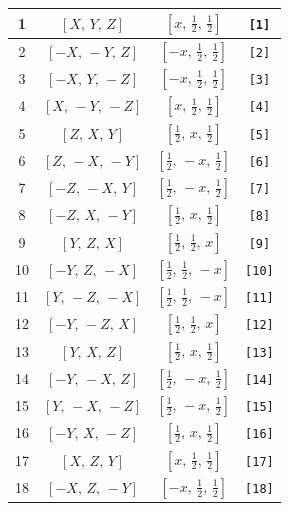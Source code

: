 \documentclass[fleqn,8pt]{jsarticle}
\begin{document}
\begin{longtable}{cccc}
1 & $\left[ X,\, Y,\, Z \right]$ & $\left[ x,\, \frac{1}{2},\, \frac{1}{2} \right]$ & {\tt [1]} \\ \hline
2 & $\left[ - X,\, - Y,\, Z \right]$ & $\left[ - x,\, \frac{1}{2},\, \frac{1}{2} \right]$ & {\tt [2]} \\ \hline
3 & $\left[ - X,\, Y,\, - Z \right]$ & $\left[ - x,\, \frac{1}{2},\, \frac{1}{2} \right]$ & {\tt [3]} \\ \hline
4 & $\left[ X,\, - Y,\, - Z \right]$ & $\left[ x,\, \frac{1}{2},\, \frac{1}{2} \right]$ & {\tt [4]} \\ \hline
5 & $\left[ Z,\, X,\, Y \right]$ & $\left[ \frac{1}{2},\, x,\, \frac{1}{2} \right]$ & {\tt [5]} \\ \hline
6 & $\left[ Z,\, - X,\, - Y \right]$ & $\left[ \frac{1}{2},\, - x,\, \frac{1}{2} \right]$ & {\tt [6]} \\ \hline
7 & $\left[ - Z,\, - X,\, Y \right]$ & $\left[ \frac{1}{2},\, - x,\, \frac{1}{2} \right]$ & {\tt [7]} \\ \hline
8 & $\left[ - Z,\, X,\, - Y \right]$ & $\left[ \frac{1}{2},\, x,\, \frac{1}{2} \right]$ & {\tt [8]} \\ \hline
9 & $\left[ Y,\, Z,\, X \right]$ & $\left[ \frac{1}{2},\, \frac{1}{2},\, x \right]$ & {\tt [9]} \\ \hline
10 & $\left[ - Y,\, Z,\, - X \right]$ & $\left[ \frac{1}{2},\, \frac{1}{2},\, - x \right]$ & {\tt [10]} \\ \hline
11 & $\left[ Y,\, - Z,\, - X \right]$ & $\left[ \frac{1}{2},\, \frac{1}{2},\, - x \right]$ & {\tt [11]} \\ \hline
12 & $\left[ - Y,\, - Z,\, X \right]$ & $\left[ \frac{1}{2},\, \frac{1}{2},\, x \right]$ & {\tt [12]} \\ \hline
13 & $\left[ Y,\, X,\, Z \right]$ & $\left[ \frac{1}{2},\, x,\, \frac{1}{2} \right]$ & {\tt [13]} \\ \hline
14 & $\left[ - Y,\, - X,\, Z \right]$ & $\left[ \frac{1}{2},\, - x,\, \frac{1}{2} \right]$ & {\tt [14]} \\ \hline
15 & $\left[ Y,\, - X,\, - Z \right]$ & $\left[ \frac{1}{2},\, - x,\, \frac{1}{2} \right]$ & {\tt [15]} \\ \hline
16 & $\left[ - Y,\, X,\, - Z \right]$ & $\left[ \frac{1}{2},\, x,\, \frac{1}{2} \right]$ & {\tt [16]} \\ \hline
17 & $\left[ X,\, Z,\, Y \right]$ & $\left[ x,\, \frac{1}{2},\, \frac{1}{2} \right]$ & {\tt [17]} \\ \hline
18 & $\left[ - X,\, Z,\, - Y \right]$ & $\left[ - x,\, \frac{1}{2},\, \frac{1}{2} \right]$ & {\tt [18]} \\ \hline

\end{longtable}
\end{document}

